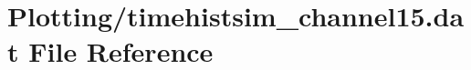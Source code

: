 \hypertarget{Plotting_2timehistsim__channel15_8dat}{}\section{Plotting/timehistsim\+\_\+channel15.dat File Reference}
\label{Plotting_2timehistsim__channel15_8dat}

